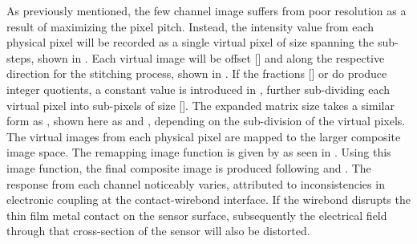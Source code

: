 \documentclass[../../main.tex]{subfiles}
\begin{document}
    As previously mentioned, the few channel image suffers from poor resolution as a result of maximizing the pixel pitch.
    Instead, the intensity value  from each physical pixel will be recorded as a single virtual pixel  of size  spanning the  sub-steps, shown in .
    Each virtual image will be offset [] and  along the respective direction for the stitching process, shown in .
    If the fractions [] or  do produce integer quotients, a constant value  is introduced in , further sub-dividing each virtual pixel into sub-pixels of size []. 
    The expanded matrix size  takes a similar form as , shown here as  and , depending on the sub-division of the virtual pixels.
    The virtual images from each physical pixel are mapped to the larger composite image space.
    The remapping image function is given by  as seen in .
    Using this image function, the final composite image is produced following  and .
    The response from each channel noticeably varies, attributed to inconsistencies in electronic coupling at the contact-wirebond interface.
    If the wirebond disrupts the thin film metal contact on the sensor surface, subsequently the electrical field through that cross-section of the sensor will also be distorted.
\end{document}
